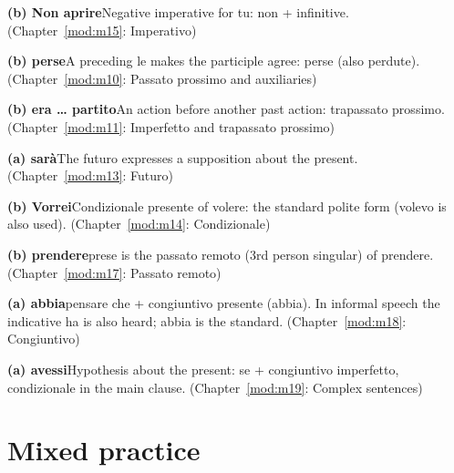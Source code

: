\documentclass[11pt,a4paper,twoside,openright]{book}
\begin{document}
\begin{answers}
\item\relax \textbf{(b) Non aprire}\newline Negative imperative for tu: non + infinitive. {\color{muted}(Chapter~\ref{mod:m15}: Imperativo)}
\item\relax \textbf{(b) perse}\newline A preceding le makes the participle agree: perse (also perdute). {\color{muted}(Chapter~\ref{mod:m10}: Passato prossimo and auxiliaries)}
\item\relax \textbf{(b) era … partito}\newline An action before another past action: trapassato prossimo. {\color{muted}(Chapter~\ref{mod:m11}: Imperfetto and trapassato prossimo)}
\item\relax \textbf{(a) sarà}\newline The futuro expresses a supposition about the present. {\color{muted}(Chapter~\ref{mod:m13}: Futuro)}
\item\relax \textbf{(b) Vorrei}\newline Condizionale presente of volere: the standard polite form (volevo is also used). {\color{muted}(Chapter~\ref{mod:m14}: Condizionale)}
\item\relax \textbf{(b) prendere}\newline prese is the passato remoto (3rd person singular) of prendere. {\color{muted}(Chapter~\ref{mod:m17}: Passato remoto)}
\item\relax \textbf{(a) abbia}\newline pensare che + congiuntivo presente (abbia). In informal speech the indicative ha is also heard; abbia is the standard. {\color{muted}(Chapter~\ref{mod:m18}: Congiuntivo)}
\item\relax \textbf{(a) avessi}\newline Hypothesis about the present: se + congiuntivo imperfetto, condizionale in the main clause. {\color{muted}(Chapter~\ref{mod:m19}: Complex sentences)}
\end{answers}

\section*{Mixed practice}
\end{document}
